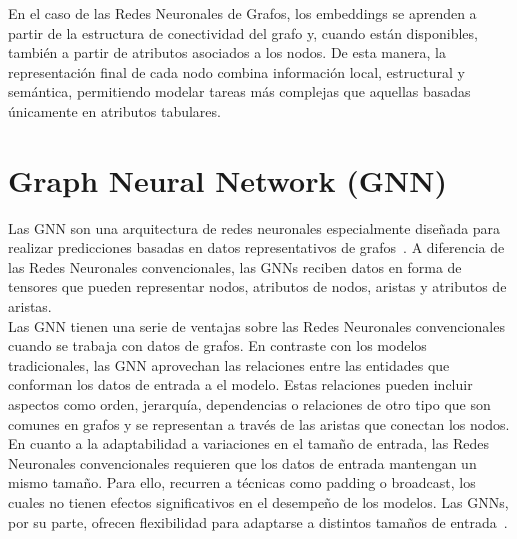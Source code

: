 En el caso de las Redes Neuronales de Grafos, los embeddings se aprenden a partir de la estructura de conectividad del grafo y, cuando están disponibles, también a partir de atributos asociados a los nodos. De esta manera, la representación final de cada nodo combina información local, estructural y semántica, permitiendo modelar tareas más complejas que aquellas basadas únicamente en atributos tabulares.

\section{Graph Neural Network (GNN)}

Las GNN son una arquitectura de redes neuronales especialmente diseñada para realizar predicciones basadas en datos representativos de grafos~\cite{scarselli_graph_2009}. A diferencia de las Redes Neuronales convencionales, las GNNs reciben datos en forma de tensores que pueden representar nodos, atributos de nodos, aristas y atributos de aristas.\\







Las GNN tienen una serie de ventajas sobre las Redes Neuronales convencionales cuando se trabaja con datos de grafos. En contraste con los modelos tradicionales, las GNN aprovechan las relaciones entre las entidades que conforman los datos de entrada a el modelo. Estas relaciones pueden incluir aspectos como orden, jerarquía, dependencias o relaciones de otro tipo que son comunes en grafos y se representan a través de las aristas que conectan los nodos.\\

En cuanto a la adaptabilidad a variaciones en el tamaño de entrada, las Redes Neuronales convencionales requieren que los datos de entrada mantengan un mismo tamaño. Para ello, recurren a técnicas como padding o broadcast, los cuales no tienen efectos significativos en el desempeño de los modelos. Las GNNs, por su parte, ofrecen flexibilidad para adaptarse a distintos tamaños de entrada~\cite{GCN}.\\

